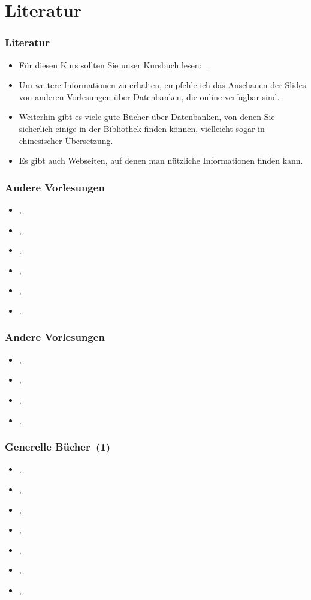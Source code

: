 \documentclass[aspectratio=169,mathserif,notheorems]{beamer}%
\begin{document}
\section{Literatur}%
%
\begin{frame}%
\frametitle{Literatur}%
\begin{itemize}%
\item Für diesen Kurs sollten Sie unser Kursbuch lesen:~.%
\item<2-> Um weitere Informationen zu erhalten, empfehle ich das Anschauen der Slides von anderen Vorlesungen über Datenbanken, die online verfügbar sind.%
\item<3-> Weiterhin gibt es viele gute Bücher über Datenbanken, von denen Sie sicherlich einige in der Bibliothek finden können, vielleicht sogar in chinesischer Übersetzung.%
\item<4-> Es gibt auch Webseiten, auf denen man nützliche Informationen finden kann.%
\end{itemize}%
\end{frame}%
%
\begin{frame}%
\frametitle{Andere Vorlesungen}%
\begin{itemize}%
\item {},%
\item {},%
\item {},%
\item {},%
\item {},%
\item {}.%
\end{itemize}%
\end{frame}%
%
\begin{frame}%
\frametitle{Andere Vorlesungen}%
\begin{itemize}%
\item {},%
\item {},%
\item {},%
\item {}.%
\end{itemize}%
\end{frame}%
%
\begin{frame}%
\frametitle{Generelle Bücher~(1)}%
\begin{itemize}%
\item {},%
\item {},%
\item {},%
\item {},%
\item {},%
\item {},%
\item {},%
\end{itemize}%
\end{frame}%
\end{document}
